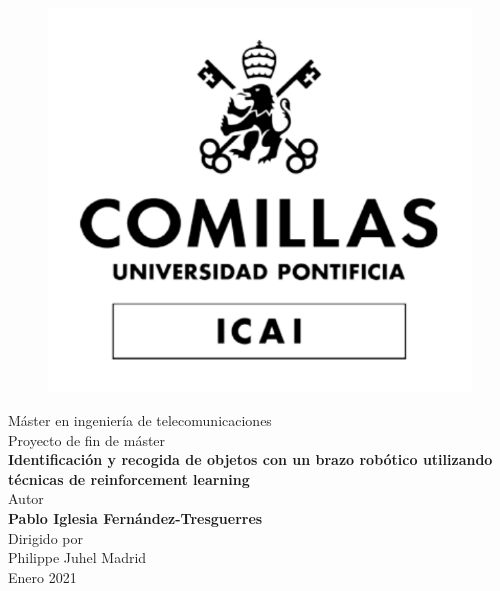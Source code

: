 \documentclass[12pt, a4paper]{thesis} %
\begin{document}
	
	\frontmatter %
	\pagestyle{empty} %
	
	\begin{titlepage}
		\begin{figure}
			\centering
			\includegraphics[width=0.6\linewidth]{LogoUniversidadBN}
		\end{figure}
		\centering
		\Large Máster en ingeniería de telecomunicaciones \\ %
		\vspace*{2.5em} %
		\centering
		Proyecto de fin de máster \\ %
		\vspace*{1em}
		\textbf{Identificación y recogida de objetos con un brazo robótico utilizando técnicas de reinforcement learning} %
		\\ \large
		\vspace*{3em}
		Autor \\ \textbf{Pablo Iglesia Fernández-Tresguerres} \\ %
		\vspace*{1em}
		Dirigido por \\ Philippe Juhel %
		\vfill
		Madrid \\
		Enero 2021 %
	\end{titlepage}
	
\end{document}
